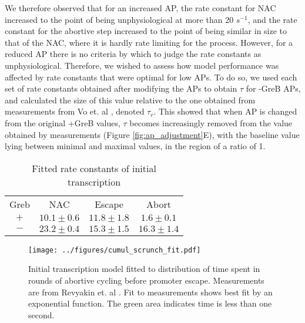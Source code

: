We therefore observed that for an increased AP, the rate constant for NAC
increased to the point of being unphysiological at more than 20 $s^{-1}$, and
the rate constant for the abortive step increased to the point of being
similar in size to that of the NAC, where it is hardly rate limiting for the
process. However, for a reduced AP there is no criteria by which to judge the
rate constants as unphysiological. Therefore, we wished to assess how model
performance was affected by rate constants that were optimal for low APs. To
do so, we used each set of rate constants obtained after modifying the APs to
obtain $\tau$ for -GreB APs, and calculated the size of this value relative to
the one obtained from measurements from Vo et. al \cite{vo_vitro_2003-1},
denoted $\tau_r$. This showed that when AP is changed from the original +GreB
values, $\tau$ becomes increasingly removed from the value obtained by
measurements (Figure \ref{fig:ap_adjustment}E), with the baseline value lying
between minimal and maximal values, in the region of a ratio of 1.

\begin{table}
  \label{tab:param_fit_revyakin}
  \caption{Fitted rate constants of initial transcription}
  \begin{center}
    \begin{tabular}{cccc}
       \toprule
       Greb & NAC & Escape & Abort \\
       $+$ & $10.1 \pm 0.6$ & $11.8 \pm 1.8$ & $1.6 \pm 0.1$ \\
       $-$ & $23.2 \pm 0.4$ & $15.3 \pm 1.5$ & $16.3 \pm 1.4$ \\
    \end{tabular}
  \end{center}
\end{table}


\begin{figure}
    \begin{center}
      \texttt{[image: ../figures/cumul\_scrunch\_fit.pdf]}
    \end{center}
    \caption{Initial transcription model fitted to distribution of time spent
      in rounds of abortive cycling before promoter escape. Measurements are
      from Revyakin et. al \cite{revyakin_abortive_2006}. Fit to measurements
      shows best fit by an exponential function. The green area indicates time
      is less than one second.}
\label{fig:revyakin_fit}
\end{figure}


